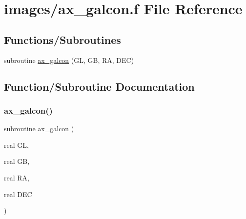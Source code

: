 \hypertarget{ax__galcon_8f}{}\section{images/ax\+\_\+galcon.f File Reference}
\label{ax__galcon_8f}
\subsection*{Functions/\+Subroutines}
\begin{DoxyCompactItemize}
\item 
subroutine \hyperlink{ax__galcon_8f_ab3fc36032381aa4fd902075e6b6bb085}{ax\+\_\+galcon} (GL, GB, RA, D\+EC)
\end{DoxyCompactItemize}


\subsection{Function/\+Subroutine Documentation}
\mbox{\label{ax__galcon_8f_ab3fc36032381aa4fd902075e6b6bb085}} 
\subsubsection{\texorpdfstring{ax\+\_\+galcon()}{ax\_galcon()}}
{\footnotesize\ttfamily subroutine ax\+\_\+galcon (\begin{DoxyParamCaption}\item[{real}]{GL,  }\item[{real}]{GB,  }\item[{real}]{RA,  }\item[{real}]{D\+EC }\end{DoxyParamCaption})}

